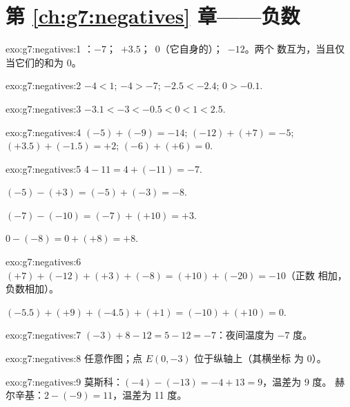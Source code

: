 \section*{第 \ref{ch:g7:negatives} 章——负数}

\begin{solution}{exo:g7:negatives:1}
：$-7$；\ $+3.5$；\ $0$（它自身的）；\ $-12$。两个
数互为，当且仅当它们的和为 $0$。
\end{solution}

\begin{solution}{exo:g7:negatives:2}
$-4 < 1$; \quad $-4 > -7$; \quad $-2.5 < -2.4$; \quad $0 > -0.1$.
\end{solution}

\begin{solution}{exo:g7:negatives:3}
$-3.1 < -3 < -0.5 < 0 < 1 < 2.5$.
\end{solution}

\begin{solution}{exo:g7:negatives:4}
$(-5) + (-9) = -14$; \quad
$(-12) + (+7) = -5$; \quad
$(+3.5) + (-1.5) = +2$; \quad
$(-6) + (+6) = 0$.
\end{solution}

\begin{solution}{exo:g7:negatives:5}
$4 - 11 = 4 + (-11) = -7$.

$(-5) - (+3) = (-5) + (-3) = -8$.

$(-7) - (-10) = (-7) + (+10) = +3$.

$0 - (-8) = 0 + (+8) = +8$.
\end{solution}

\begin{solution}{exo:g7:negatives:6}
$(+7) + (-12) + (+3) + (-8) = (+10) + (-20) = -10$（正数
相加，负数相加）。

$(-5.5) + (+9) + (-4.5) + (+1) = (-10) + (+10) = 0$.
\end{solution}

\begin{solution}{exo:g7:negatives:7}
$(-3) + 8 - 12 = 5 - 12 = -7$：夜间温度为 $-7$ 度。
\end{solution}

\begin{solution}{exo:g7:negatives:8}
任意作图；点 $E(0, -3)$ 位于纵轴上（其横坐标
为 $0$）。
\end{solution}

\begin{solution}{exo:g7:negatives:9}
莫斯科：$(-4) - (-13) = -4 + 13 = 9$，温差为 9 度。
赫尔辛基：$2 - (-9) = 11$，温差为 11 度。
\end{solution}

